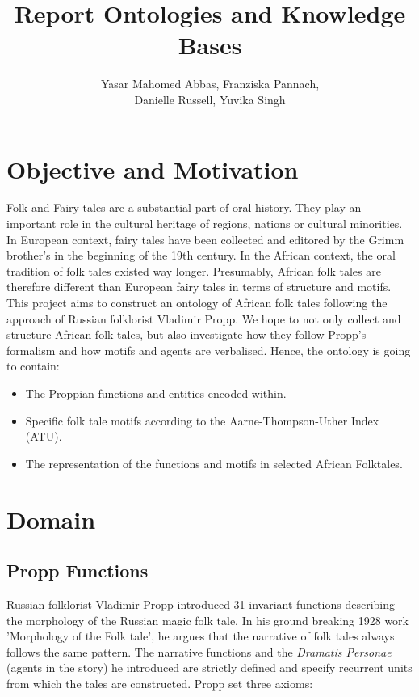 \documentclass[10pt,a4paper]{article}
\author{Yasar Mahomed Abbas, Franziska Pannach, \\Danielle Russell, Yuvika Singh}
\title{Report Ontologies and Knowledge Bases}
\begin{document}
\maketitle


\section{Objective and Motivation}
Folk and Fairy tales are a substantial part of oral history. They play an important role in the cultural heritage of regions, nations or cultural minorities. In European context, fairy tales have been collected and editored by the Grimm brother's in the beginning of the 19th century.\cite{Grimm1857} In the African context, the oral tradition of folk tales existed way longer. Presumably, African folk tales are therefore different than European fairy tales in terms of structure and motifs. 
This project aims to construct an ontology of African folk tales following the approach of Russian folklorist Vladimir Propp. We hope to not only collect and structure African folk tales, but also investigate how they follow Propp's formalism and how motifs and agents are verbalised.
Hence, the ontology is going to contain: 

\begin{itemize}
	\item The Proppian functions and entities encoded within. 
	\item Specific folk tale motifs according to the Aarne-Thompson-Uther Index (ATU). 
	\item The representation of the functions and motifs in selected African Folktales. 
\end{itemize}


\section{Domain}
	\subsection{Propp Functions} 
	Russian folklorist Vladimir Propp introduced 31 invariant functions describing the morphology of the Russian magic folk tale. In his ground breaking 1928 work 'Morphology of the Folk tale', he argues that the narrative of folk tales always follows the same pattern. The narrative functions and the \textit{Dramatis Personae} (agents in the story) he introduced are strictly defined and specify recurrent units from which the tales are constructed. 
	Propp set three axioms: 
	
\end{document}
